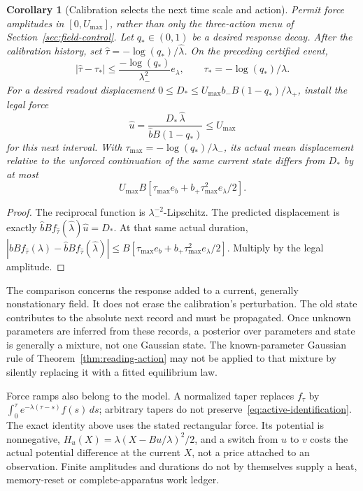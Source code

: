 \documentclass[12pt,a4paper]{article}
\newtheorem{corollary}[theorem]{Corollary}
\begin{document}
\begin{corollary}[Calibration selects the next time scale and action]
\label{cor:active-next}
Permit force amplitudes in $[0,U_{\max}]$, rather than only the
three-action menu of Section~\ref{sec:field-control}.
Let $q_*\in(0,1)$ be a desired response decay. After the calibration
history, set $\widehat\tau=-\log(q_*)/\widehat\lambda$.
On the preceding certified event,
\[
 |\widehat\tau-\tau_*|
 \le\frac{-\log(q_*)}{\lambda_-^2}e_\lambda,
 \qquad \tau_*=-\log(q_*)/\lambda .
\]
For a desired readout displacement
$0\le D_*\le U_{\max}b_-B(1-q_*)/\lambda_+$, install the legal force
\[
 \widehat u=\frac{D_*\,\widehat\lambda}
                  {\widehat b B(1-q_*)}\le U_{\max}
\]
for this next interval. With $\tau_{\max}=-\log(q_*)/\lambda_-$,
its actual mean displacement relative to the unforced continuation
of the same current state differs from $D_*$ by at most
\[
 U_{\max}B\left[\tau_{\max}e_b+
                       b_+\tau_{\max}^2 e_\lambda/2\right].
\]
\end{corollary}
\begin{proof}
The reciprocal function is $\lambda_-^{-2}$-Lipschitz.
The predicted displacement is exactly
$\widehat b B f_{\widehat\tau}(\widehat\lambda)\widehat u=D_*$.
At that same actual duration,
$|bBf_{\widehat\tau}(\lambda)-
 \widehat b Bf_{\widehat\tau}(\widehat\lambda)|
\le B[\tau_{\max}e_b+b_+\tau_{\max}^2e_\lambda/2]$.
Multiply by the legal amplitude.
\end{proof}

The comparison concerns the response added to a current, generally
nonstationary field. It does not erase the calibration's perturbation.
The old state contributes to the absolute next record and must be
propagated. Once unknown parameters are inferred from these records,
a posterior over parameters and state is generally a mixture, not
one Gaussian state. The known-parameter Gaussian rule of
Theorem~\ref{thm:reading-action} may not be applied to that mixture by
silently replacing it with a fitted equilibrium law.

Force ramps also belong to the model. A normalized taper replaces
$f_\tau$ by
$\int_0^\tau e^{-\lambda(\tau-s)}f(s)\,ds$; arbitrary tapers do not
preserve~\eqref{eq:active-identification}. The exact identity above
uses the stated rectangular force. Its potential is nonnegative,
$H_u(X)=\lambda(X-Bu/\lambda)^2/2$, and a switch from $u$ to $v$
costs the actual potential difference at the current $X$, not a
price attached to an observation. Finite amplitudes and durations
do not by themselves supply a heat, memory-reset or complete-apparatus
work ledger.
\end{document}
